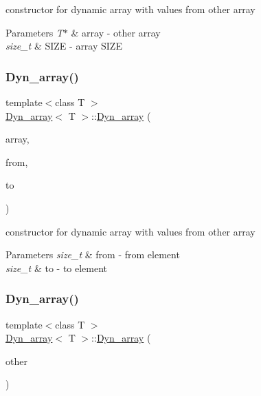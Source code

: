 constructor for dynamic array with values from other array 


\begin{DoxyParams}{Parameters}
{\em T$\ast$} & array -\/ other array \\
\hline
{\em size\+\_\+t} & S\+I\+ZE -\/ array S\+I\+ZE \\
\hline
\end{DoxyParams}
\mbox{\label{classDyn__array_a7fa28275bd20add3643eeab60e06a431}} 
\subsubsection{\texorpdfstring{Dyn\+\_\+array()}{Dyn\_array()}\hspace{0.1cm}{\footnotesize\ttfamily [5/6]}}
{\footnotesize\ttfamily template$<$class T $>$ \\
\hyperlink{classDyn__array}{Dyn\+\_\+array}$<$ T $>$\+::\hyperlink{classDyn__array}{Dyn\+\_\+array} (\begin{DoxyParamCaption}\item[{const T $\ast$}]{array,  }\item[{size\+\_\+t}]{from,  }\item[{const size\+\_\+t}]{to }\end{DoxyParamCaption})}



constructor for dynamic array with values from other array 


\begin{DoxyParams}{Parameters}
{\em size\+\_\+t} & from -\/ from element \\
\hline
{\em size\+\_\+t} & to -\/ to element \\
\hline
\end{DoxyParams}
\mbox{\label{classDyn__array_a83d19f61fc7cef07e8125911729fd3bf}} 
\subsubsection{\texorpdfstring{Dyn\+\_\+array()}{Dyn\_array()}\hspace{0.1cm}{\footnotesize\ttfamily [6/6]}}
{\footnotesize\ttfamily template$<$class T $>$ \\
\hyperlink{classDyn__array}{Dyn\+\_\+array}$<$ T $>$\+::\hyperlink{classDyn__array}{Dyn\+\_\+array} (\begin{DoxyParamCaption}\item[{const \hyperlink{classDyn__array}{Dyn\+\_\+array}$<$ T $>$ \&}]{other }\end{DoxyParamCaption})}



